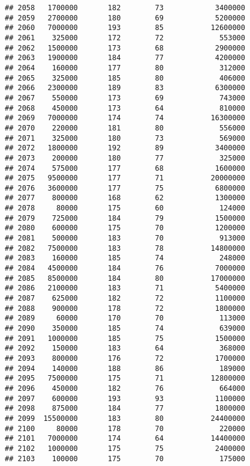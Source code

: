 \documentclass[
]{article}
\begin{document}
\begin{verbatim}
## 2058   1700000       182        73            3400000
## 2059   2700000       180        69            5200000
## 2060   7000000       193        85           12600000
## 2061    325000       172        72             553000
## 2062   1500000       173        68            2900000
## 2063   1900000       184        77            4200000
## 2064    160000       177        80             312000
## 2065    325000       185        80             406000
## 2066   2300000       189        83            6300000
## 2067    550000       173        69             743000
## 2068    450000       173        64             810000
## 2069   7000000       174        74           16300000
## 2070    220000       181        80             556000
## 2071    325000       180        73             569000
## 2072   1800000       192        89            3400000
## 2073    200000       180        77             325000
## 2074    575000       177        68            1600000
## 2075   9500000       177        71           20000000
## 2076   3600000       177        75            6800000
## 2077    800000       168        62            1300000
## 2078     80000       175        60             124000
## 2079    725000       184        79            1500000
## 2080    600000       175        70            1200000
## 2081    500000       183        70             913000
## 2082   7500000       183        78           14800000
## 2083    160000       185        74             248000
## 2084   4500000       184        76            7000000
## 2085   8500000       184        80           17000000
## 2086   2100000       183        71            5400000
## 2087    625000       182        72            1100000
## 2088    900000       178        72            1800000
## 2089     60000       170        70             113000
## 2090    350000       185        74             639000
## 2091   1000000       185        75            1500000
## 2092    150000       183        64             368000
## 2093    800000       176        72            1700000
## 2094    140000       188        86             189000
## 2095   7500000       175        71           12800000
## 2096    450000       182        76             664000
## 2097    600000       193        93            1100000
## 2098    875000       184        77            1800000
## 2099  15500000       183        80           24400000
## 2100     80000       178        70             220000
## 2101   7000000       174        64           14400000
## 2102   1000000       175        75            2400000
## 2103    100000       175        70             175000

\end{verbatim}
\end{document}
